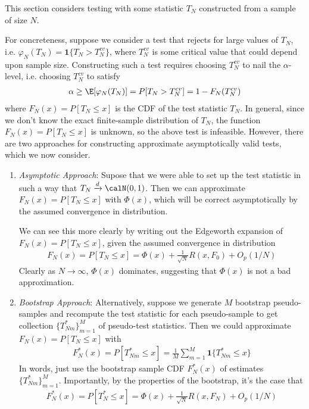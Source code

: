 \documentclass[12pt]{article}
\theoremstyle{plain}
\theoremstyle{definition}
\theoremstyle{remark}
\newcommand{\ra}{\rightarrow}
\newcommand{\dto}{\xrightarrow{d}}
\begin{document}
This section considers testing with some statistic $T_N$ constructed
from a sample of size $N$.

For concreteness, suppose we  consider a test that rejects for large
values of $T_N$, i.e.  $\varphi_N(T_N)=\mathbf{1}\{T_N> T_N^{cv}\}$,
where $T_N^{cv}$ is some critical value that could depend upon sample
size.
Constructing such a test requires choosing $T_N^{cv}$ to nail the
$\alpha$-level, i.e. choosing $T_N^{cv}$ to satisfy
\begin{align*}
  \alpha \geq \E[\varphi_N(T_N)]
  = P[T_N> T_N^{cv}]
  = 1-F_N(T_N^{cv})
\end{align*}
where $F_N(x)=P[T_N\leq x]$ is the CDF of the test statistic $T_N$.
In general, since we don't know the exact finite-sample distribution of
$T_N$, the function $F_N(x)=P[T_N\leq x]$ is unknown, so the above test
is infeasible.
However, there are two approaches for constructing approximate
asymptotically valid tests, which we now consider.
\begin{enumerate}
  \item \emph{Asymptotic Approach}:
    Supose that we were able to set up the test statistic in such a way
    that $T_N\dto\calN(0,1)$.
    Then we can approximate $F_N(x)=P[T_N\leq x]$ with $\Phi(x)$, which
    will be correct asymptotically by the assumed convergence in
    distribution.

    We can see this more clearly by writing out the Edgeworth expansion
    of $F_N(x)=P[T_N\leq x]$, given the assumed convergence in
    distribution
    \begin{align}
      F_N(x)=P[T_N\leq x] =
      \Phi(x) +
      \frac{1}{\sqrt{N}}
      R(x,F_0)
      +
      O_p(1/N)
      \label{FN}
    \end{align}
    Clearly as $N\ra\infty$, $\Phi(x)$ dominates, suggesting that
    $\Phi(x)$ is not a bad approximation.


  \item \emph{Bootstrap Approach}:
    Alternatively, suppose we generate $M$ bootstrap pseudo-samples and
    recompute the test statistic for each pseudo-sample to get
    collection $\{T_{Nm}^*\}_{m=1}^M$ of pseudo-test statistics.
    Then we could approximate $F_N(x)=P[T_N\leq x]$ with
    \begin{align*}
      F_N^*(x)
      =P[T_{Nm}^*\leq x]
      =
      \frac{1}{M}
      \sum_{m=1}^M
      \mathbf{1}\{
        T_{Nm}^* \leq x
      \}
    \end{align*}
    In words, just use the bootstrap sample CDF $F_N^*(x)$ of
    estimates $\{T_{Nm}^*\}_{m=1}^M$.
    Importantly, by the properties of the bootstrap, it's the case that
    \begin{align}
      F_N^*(x)=P[T_N^*\leq x] =
      \Phi(x) +
      \frac{1}{\sqrt{N}}
      R(x,F_N)
      +
      O_p(1/N)
      \label{bootstart}
    \end{align}
\end{enumerate}
\end{document}
